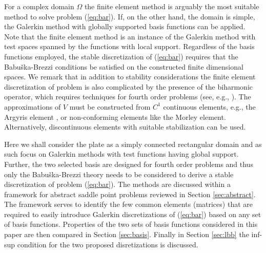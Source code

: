 \documentclass{marine_2015}
\begin{document}
For a complex domain $\Omega$ the finite element method is arguably the most 
suitable method to solve problem (\ref{eq:bar}). If, on the other hand, the
domain is simple, the Galerkin method with globally supported basis functions
can be applied. Note that the finite element method is an instance of the Galerkin 
method with test spaces spanned by the functions with local support. Regardless
of the basis functions employed, the stable discretization of (\ref{eq:bar})
requires that the Babu\v{s}ka-Brezzi conditions be satisfied on the constructed
finite dimensional spaces. We remark that in addition to stability
considerations the finite element discretization of problem is also complicated
by the presence of the biharmonic operator, which requires techniques for fourth order 
problems (see, e.g., \cite{brenner}). The approximations of $V$ must be constructed 
from $C^1$ continuous elements, e.g., the Argyris element \cite{argyris}, or non-conforming 
elements like the Morley element\cite{morley}. Alternatively, discontinuous elements with 
suitable stabilization \cite{brennerip} can be used. 

Here we shall consider the plate as a simply connected rectangular domain and as
such focus on Galerkin methods with test functions having global support.
Further, the two selected basis are designed for fourth order problems and thus 
only the Babu\v{s}ka-Brezzi theory needs to be considered to derive a stable
discretization of problem (\ref{eq:bar}). The methods are discussed within a
framework for abstract saddle point problems reviewed in Section
\ref{sec:abstract}. The framework serves to identify the few common
elements (matrices) that are required to easily introduce Galerkin discretizations of
(\ref{eq:bar}) based on any set of basis functions. Properties of the two sets of
basis functions considered in this paper are then compared in Section \ref{sec:basis}.
Finally in Section \ref{sec:lbb} the inf-sup condition for the two proposed
disretizations is discussed.
\end{document}
